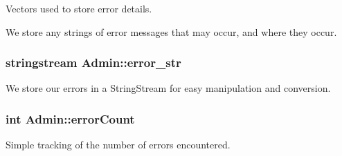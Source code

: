 Vectors used to store error details. 

We store any strings of error messages that may occur, and where they occur. \hypertarget{classAdmin_ad5610f86befa3a43987ce15cfc389d28}{
\subsubsection[{error\_\-str}]{\setlength{\rightskip}{0pt plus 5cm}stringstream {\bf Admin::error\_\-str}}}
\label{classAdmin_ad5610f86befa3a43987ce15cfc389d28}


We store our errors in a StringStream for easy manipulation and conversion. 

\hypertarget{classAdmin_ae29edcd0464b203b35f72caba6af7295}{
\subsubsection[{errorCount}]{\setlength{\rightskip}{0pt plus 5cm}int {\bf Admin::errorCount}}}
\label{classAdmin_ae29edcd0464b203b35f72caba6af7295}


Simple tracking of the number of errors encountered. 

